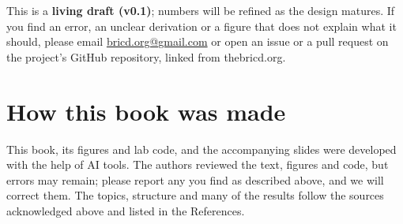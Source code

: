 This is a \textbf{living draft (v0.1)}; numbers will be refined as the design matures. If you find an error, an unclear derivation or a figure that does not explain what it should, please email \href{mailto:bricd.org@gmail.com}{bricd.org@gmail.com} or open an issue or a pull request on the project's GitHub repository, linked from thebricd.org.

\section*{How this book was made}
This book, its figures and lab code, and the accompanying slides were developed with the help of AI tools. The authors reviewed the text, figures and code, but errors may remain; please report any you find as described above, and we will correct them. The topics, structure and many of the results follow the sources acknowledged above and listed in the References.

